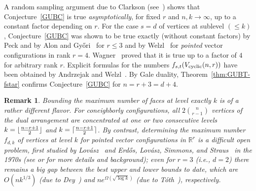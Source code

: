 \documentclass[11pt]{article}
\newtheorem{remark}[theorem]{Remark}
\renewcommand{\leq}{\leqslant}
\newcommand{\R}{\mathbb{R}}
\DeclarePairedDelimiter\ceil{\lceil}{\rceil}
\DeclarePairedDelimiter\floor{\lfloor}{\rfloor}
\newcommand{\cyclic}{V_{\textup{cyclic}}}
\begin{document}
A random sampling argument due to Clarkson (see~\cite{Clarkson:1989aa}) shows that Conjecture~\ref{GUBC} is true \emph{asymptotically}, for fixed $r$ and $n,k\to \infty$, up to a constant factor depending on $r$. For the case $s=d$ of vertices at sublevel $(\leq k)$, Conjecture~\ref{GUBC} was shown to be true exactly (without constant factors) by Peck \cite{Peck:1985aa} and by Alon and Gy\H{o}ri~\cite{Alon:1986aa} for $r\leq 3$ and by Welzl~\cite{Welzl:2001aa} for \emph{pointed} vector configurations in rank $r=4$.  Wagner~\cite{Wagner:2006aa} proved that it is true up to a factor of $4$ for arbitrary rank $r$. Explicit formulas for the numbers $f_{s,t}(\cyclic(n,r))$ %
have been obtained by Andrzejak and Welzl~\cite{Andrzejak:2003aa}. 
%
By Gale duality, Theorem~\ref{thm:GUBT-fstar} confirms Conjecture~\ref{GUBC} for $n=r+3=d+4$. 
%
\begin{remark} Bounding the maximum number of faces at level \emph{exactly} $k$ is of a rather different flavor. For coneighborly configurations, all $2\binom{n}{r-1}$ vertices of the dual arrangement are concentrated at one or two consecutive levels $k=\floor{\frac{n-r+1}{2}}$ and $k=\ceil{\frac{n-r+1}{2}}$. By contrast, determining the maximum number $f_{d,k}$ of vertices at level $k$ for \emph{pointed} vector configurations in $\R^r$ is a difficult open problem, first studied by Lov\'asz~\cite{Lovasz:1971aa} and Erd\H{o}s, Lov\'asz, Simmons, and Straus~\cite{Erdos:1973aa} in the 1970s (see \cite{Wagner:2008aa} or \cite[Ch.~11]{Matousek:2002aa} for more details and background); even for $r=3$ (i.e., $d=2$) there remains a big gap between the best upper and lower bounds to date, which are $O(nk^{1/3})$ (due to Dey~\cite{Dey:1998aa}) and $ne^{\Omega(\sqrt{\log k})}$ (due to T\'oth~\cite{Toth:2001aa}), respectively.
\end{remark}
%
%
\end{document}
